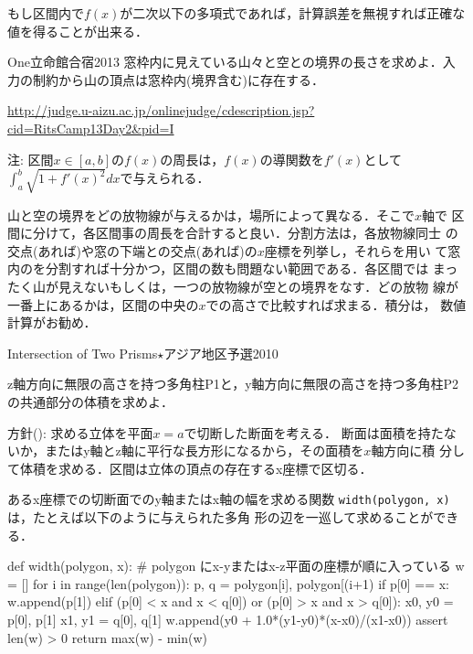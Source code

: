 \begin{versionbeta}
もし区間内で$f(x)$が二次以下の多項式であれば，計算誤差を無視すれば正確な値を得ることが出来る．

\begin{pbox}{One}{立命館合宿2013}
  窓枠内に見えている山々と空との境界の長さを求めよ．入力の制約から山の頂点は窓枠内(境界含む)に存在する．

\url{http://judge.u-aizu.ac.jp/onlinejudge/cdescription.jsp?cid=RitsCamp13Day2&pid=I}
\end{pbox}
注: 区間$x\in[a,b]$の$f(x)$の周長は，$f(x)$の導関数を$f'(x)$として$\int_a^b \sqrt{1+f'(x)^2}dx$で与えられる．

山と空の境界をどの放物線が与えるかは，場所によって異なる．そこで$x$軸で
区間に分けて，各区間事の周長を合計すると良い．分割方法は，各放物線同士
の交点(あれば)や窓の下端との交点(あれば)の$x$座標を列挙し，それらを用い
て窓内のを分割すれば十分かつ，区間の数も問題ない範囲である．各区間では
まったく山が見えないもしくは，一つの放物線が空との境界をなす．どの放物
線が一番上にあるかは，区間の中央の$x$での高さで比較すれば求まる．積分は，
数値計算がお勧め．

\begin{pbox}{Intersection of Two Prisms$\star$}{アジア地区予選2010}

z軸方向に無限の高さを持つ多角柱P1と，y軸方向に無限の高さを持つ多角柱P2の共通部分の体積を求めよ．

\end{pbox}

方針(\pccbook[pp.~236--]): 求める立体を平面$x=a$で切断した断面を考える．
断面は面積を持たないか，またはy軸とz軸に平行な長方形になるから，その面積を$x$軸方向に積
分して体積を求める．区間は立体の頂点の存在するx座標で区切る．

あるx座標での切断面でのy軸またはx軸の幅を求める関数
\texttt{width(polygon, x)}は，たとえば以下のように与えられた多角
形の辺を一巡して求めることができる．

\begin{pybox}[emph={width},emph={[2]w}]
def width(polygon, x): # polygon にx-yまたはx-z平面の座標が順に入っている
    w = []
    for i in range(len(polygon)):
        p, q = polygon[i], polygon[(i+1)
        if p[0] == x:
            w.append(p[1])
        elif (p[0] < x and x < q[0]) or (p[0] > x and x > q[0]):
            x0, y0 = p[0], p[1]
            x1, y1 = q[0], q[1]
            w.append(y0 + 1.0*(y1-y0)*(x-x0)/(x1-x0))
    assert len(w) > 0
    return max(w) - min(w)
\end{pybox}


\end{versionbeta}
